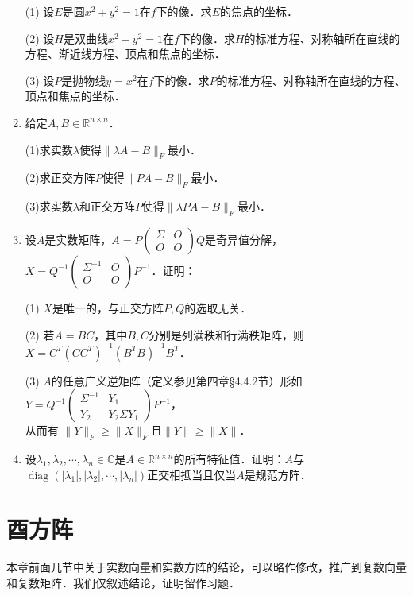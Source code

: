\documentclass[a4paper,fontset=windows]{ctexbook}
\theoremstyle{definition}
\DeclareMathOperator{\diag}{diag}
\renewcommand{\ge}{\geqslant}
\begin{document}
\begin{enumerate}
(1) 设$E$是圆$x^2+y^2=1$在$f$下的像．求$E$的焦点的坐标．

(2) 设$H$是双曲线$x^2-y^2=1$在$f$下的像．求$H$的标准方程、对称轴所在直线的方程、渐近线方程、顶点和焦点的坐标．

(3) 设$P$是抛物线$y=x^2$在$f$下的像．求$P$的标准方程、对称轴所在直线的方程、顶点和焦点的坐标．

\item 给定$A,B\in\mathbb{R}^{n\times n}$．

(1)求实数$\lambda$使得$\|\lambda A-B\|_F$最小．

(2)求正交方阵$P$使得$\|PA-B\|_F$最小．

(3)求实数$\lambda$和正交方阵$P$使得$\|\lambda PA-B\|_F$最小．

\item 设$A$是实数矩阵，$A=P\begin{pmatrix}\Sigma&O \\ O&O\end{pmatrix}Q$是奇异值分解，$X=Q^{-1}\begin{pmatrix}\Sigma^{-1}&O \\ O&O\end{pmatrix}P^{-1}$．证明：

(1) $X$是唯一的，与正交方阵$P,Q$的选取无关．

(2) 若$A=BC$，其中$B,C$分别是列满秩和行满秩矩阵，则$X=C^T(CC^T)^{-1}(B^TB)^{-1}B^T$．

(3) $A$的任意广义逆矩阵（定义参见第四章\S 4.4.2节）形如$Y=Q^{-1}\begin{pmatrix}\Sigma^{-1}&Y_1 \\ Y_2&Y_2\Sigma Y_1\end{pmatrix}P^{-1}$，\\ 从而有
$\|Y\|_F\ge\|X\|_F$且$\|Y\|\ge\|X\|$．

\item 设$\lambda_1,\lambda_2,\cdots,\lambda_n\in\mathbb{C}$是$A\in\mathbb{R}^{n\times n}$的所有特征值．证明：$A$与$\diag(|\lambda_1|,|\lambda_2|,\cdots,|\lambda_n|)$正交相抵当且仅当$A$是规范方阵．

\end{enumerate}

\clearpage\section{酉方阵}

本章前面几节中关于实数向量和实数方阵的结论，可以略作修改，推广到复数向量和复数矩阵．我们仅叙述结论，证明留作习题．
\end{document}
